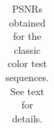 \documentclass[10pt, a4paper]{article}
\newcommand{\bsic}[1]{\textcolor{black}{\textit{#1}}}
\newcommand{\Bsic}[1]{\textcolor{black}{\textbf{\textit{#1}}}}
\newcommand{\Best}[1]{\textbf{\textcolor{black}{#1}}}
\begin{document}
\begin{table}[htp!]
\begin{center}
{\begin{tabular}{ c | l |c c | c c | c c | c c | c c | c}
		\end{tabular}}
	\end{center}
	\caption{PSNRs obtained for the classic color test sequences. See text for
		details.}
	\label{tab:psnr-classic-color}
\end{table}
\end{document}
